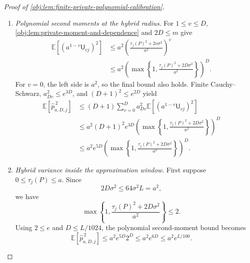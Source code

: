 \begin{proof}[Proof of \cref{obj:lem:finite-private-polynomial-calibration}]
\begin{enumerate}
\item \textit{Polynomial second moments at the hybrid radius.}
For \(1\le v\le D\), \cref{obj:lem:private-moment-and-dependence} and \(2D\le m\) give
\[
\begin{aligned}
\mathbb E[(a^{1-v}\mathsf U_{vj})^2]
&\le a^2
 \left(\frac{\tau_j(P)^2+2v\sigma^2}{a^2}\right)^v\\
&\le a^2
 \left(\max\left\{1,\frac{\tau_j(P)^2+2D\sigma^2}{a^2}\right\}\right)^D.
\end{aligned}
\]
For \(v=0\), the left side is \(a^2\), so the final bound also holds. Finite Cauchy--Schwarz, \(a_{Dv}^2\le e^{3D}\), and \((D+1)^2\le e^{2D}\) yield
\[
\begin{aligned}
\mathbb E[\widehat p_{a,D,j}^{\,2}]
&\le(D+1)\sum_{v=0}^D
 a_{Dv}^2\mathbb E[(a^{1-v}\mathsf U_{vj})^2]\\
&\le a^2(D+1)^2e^{3D}
 \left(\max\left\{1,\frac{\tau_j(P)^2+2D\sigma^2}{a^2}\right\}\right)^D\\
&\le a^2e^{5D}
 \left(\max\left\{1,\frac{\tau_j(P)^2+2D\sigma^2}{a^2}\right\}\right)^D.
\end{aligned}
\]

\item \textit{Hybrid variance inside the approximation window.}
First suppose \(0\le\tau_j(P)\le a\). Since
\[
2D\sigma^2\le64\sigma^2L=a^2,
\]
we have
\[
\max\left\{1,\frac{\tau_j(P)^2+2D\sigma^2}{a^2}\right\}\le2.
\]
Using \(2\le e\) and \(D\le L/1024\), the polynomial second-moment bound becomes
\[
\mathbb E[\widehat p_{a,D,j}^{\,2}]
\le a^2e^{5D}2^D
\le a^2e^{6D}
\le a^2e^{L/100}.
\]


\end{enumerate}
\end{proof}

